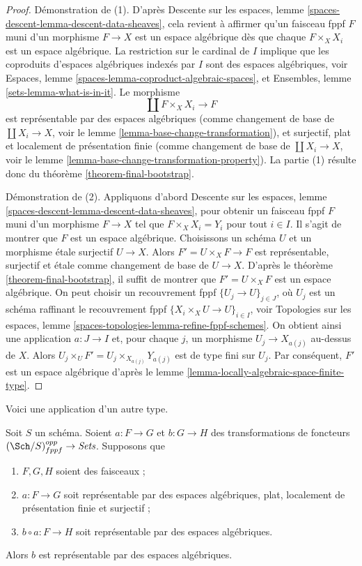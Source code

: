 \begin{proof}
Démonstration de (1). D'après
Descente sur les espaces, lemme \ref{spaces-descent-lemma-descent-data-sheaves},
cela revient à affirmer qu'un faisceau fppf $F$
muni d'un morphisme $F \to X$ est un espace algébrique dès que
chaque $F \times_X X_i$ est un espace algébrique.
La restriction sur le cardinal de $I$ implique que
les coproduits d'espaces algébriques indexés par $I$ sont des espaces algébriques, voir
Espaces, lemme \ref{spaces-lemma-coproduct-algebraic-spaces},
et
Ensembles, lemme \ref{sets-lemma-what-is-in-it}.
Le morphisme
$$
\coprod F \times_X X_i \longrightarrow F
$$
est représentable par des espaces algébriques (comme changement de base de
$\coprod X_i \to X$, voir le lemme \ref{lemma-base-change-transformation}),
et surjectif, plat et localement de présentation finie
(comme changement de base de $\coprod X_i \to X$, voir le
lemme \ref{lemma-base-change-transformation-property}).
La partie (1) résulte donc du théorème \ref{theorem-final-bootstrap}.

\medskip\noindent
Démonstration de (2). Appliquons d'abord
Descente sur les espaces, lemme \ref{spaces-descent-lemma-descent-data-sheaves},
pour obtenir un faisceau fppf $F$ muni d'un morphisme $F \to X$
tel que $F \times_X X_i = Y_i$ pour tout $i \in I$.
Il s'agit de montrer que $F$ est un espace algébrique.
Choisissons un schéma $U$ et un morphisme étale surjectif $U \to X$.
Alors $F' = U \times_X F \to F$ est représentable, surjectif et étale
comme changement de base de $U \to X$.
D'après le théorème \ref{theorem-final-bootstrap}, il suffit de montrer
que $F' = U \times_X F$ est un espace algébrique.
On peut choisir un recouvrement fppf $\{U_j \to U\}_{j \in J}$,
où $U_j$ est un schéma raffinant le recouvrement fppf
$\{X_i \times_X U \to U\}_{i \in I}$, voir
Topologies sur les espaces, lemme
\ref{spaces-topologies-lemma-refine-fppf-schemes}.
On obtient ainsi une application $a : J \to I$ et, pour chaque $j$,
un morphisme $U_j \to X_{a(j)}$ au-dessus de $X$.
Alors $U_j \times_U F' = U_j \times_{X_{a(j)}} Y_{a(j)}$
est de type fini sur $U_j$. Par conséquent, $F'$ est un espace
algébrique d'après le lemme \ref{lemma-locally-algebraic-space-finite-type}.
\end{proof}

\noindent
Voici une application d'un autre type.

\begin{lemma}
\label{lemma-representable-by-spaces-cover}
Soit $S$ un schéma. Soient $a : F \to G$ et $b : G \to H$ des
transformations de foncteurs $(\Sch/S)_{fppf}^{opp} \to \textit{Sets}$.
Supposons que
\begin{enumerate}
\item $F, G, H$ soient des faisceaux ;
\item $a : F \to G$ soit représentable par des espaces algébriques, plat,
localement de présentation finie et surjectif ;
\item $b \circ a : F \to H$ soit représentable par des espaces algébriques.
\end{enumerate}
Alors $b$ est représentable par des espaces algébriques.
\end{lemma}

